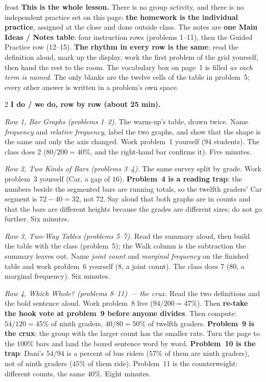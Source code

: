 \documentclass[10pt]{article}
\begin{document}
\boxguard
\begin{skillbox}{frost}
\textbf{This is the whole lesson.} There is no group activity, and there is no independent
practice set on this page: \textbf{the homework is the individual practice}, assigned at the
close and done outside class. The notes are \textbf{one Main Ideas / Notes table}: four
instruction rows (problems 1--11), then the Guided Practice row (12--15). \textbf{The rhythm in
every row is the same}: read the definition aloud, mark up the display, work the first problem of
the grid yourself, then hand the rest to the room. The vocabulary box on page~1 is filled
\emph{as each term is named}. The only blanks are the twelve cells of the table in problem~5;
every other answer is written in a problem's own space.
\begin{multicols}{2}
\textbf{I do / we do, row by row (about 25 min).}

\emph{Row 1, Bar Graphs (problems 1--2).} The warm-up's table, drawn twice. Name
\emph{frequency} and \emph{relative frequency}, label the two graphs, and show that the shape is
the same and only the axis changed. Work problem~1 yourself ($94$ students). The class does 2
($80/200 = 40\%$, and the right-hand bar confirms it). Five minutes.

\emph{Row 2, Two Kinds of Bars (problems 3--4).} The same survey split by grade. Work problem~3
yourself (Car, a gap of $16$). \textbf{Problem~4 is a reading trap}: the numbers beside the
segmented bars are running totals, so the twelfth graders' Car segment is $72 - 40 = 32$, not
$72$. Say aloud that both graphs are in counts and that the bars are different heights because
the grades are different sizes; do not go further. Six minutes.

\emph{Row 3, Two-Way Tables (problems 5--7).} Read the summary aloud, then build the table with
the class (problem~5); the Walk column is the subtraction the summary leaves out. Name \emph{joint
count} and \emph{marginal frequency} on the finished table and work problem~6 yourself ($8$, a
joint count). The class does 7 ($80$, a marginal frequency). Six minutes.

\emph{Row 4, Which Whole? (problems 8--11) --- the crux.} Read the two definitions and the bold
sentence aloud. Work problem~8 live ($94/200 = 47\%$). Then \textbf{re-take the hook vote at
problem~9 before anyone divides}. Then compute: $54/120 = 45\%$ of ninth graders, $40/80 = 50\%$
of twelfth graders. \textbf{Problem~9 is the crux}: the group with the larger count has the
smaller rate. Turn the page to the $100\%$ bars and land the boxed sentence word by word.
\textbf{Problem~10 is the trap}: Dani's $54/94$ is a percent of bus riders ($57\%$ of them are
ninth graders), not of ninth graders ($45\%$ of them ride). Problem~11 is the counterweight:
different counts, the same $40\%$. Eight minutes.


\end{multicols}
\end{skillbox}
\end{document}
